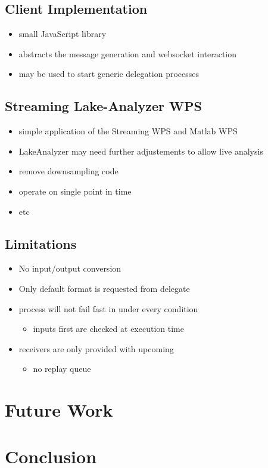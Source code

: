 	\subsection{Client Implementation}
	\begin{itemize}
		\item small JavaScript library
		\item abstracts the message generation and websocket interaction
		\item may be used to start generic delegation processes
	\end{itemize}
	\subsection{Streaming Lake-Analyzer WPS}
	\begin{itemize}
		\item simple application of the Streaming WPS and Matlab WPS
		\item LakeAnalyzer may need further adjustements to allow live analysis
		\item remove downsampling code
		\item operate on single point in time
		\item etc
	\end{itemize}
	\subsection{Limitations}
	\begin{itemize}
		\item No input/output conversion
		\item Only default format is requested from delegate
		\item process will not fail fast in under every condition
		\begin{itemize}
			\item inputs first are checked at execution time
		\end{itemize}
		\item receivers are only provided with upcoming
		\begin{itemize}
			\item no replay queue
		\end{itemize}
	\end{itemize}
\section{Future Work}
\section{Conclusion}